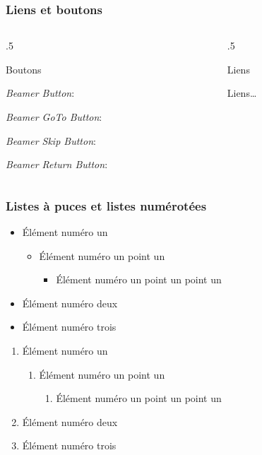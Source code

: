 \documentclass[aspectratio=1610,compress,t,english,french]{beamer}
\newenvironment{HECcomparaison}[1]{%
	\begin{column}[t]{.5\textwidth}
		\vspace{-7mm}		
		\begin{block}{#1}
}{%
		\end{block}
	\end{column}
}
\begin{document}
\begin{frame}
\frametitle{Liens et boutons}
	\begin{columns}
		\begin{HECcomparaison}{Boutons}
			\emph{Beamer Button}:\\			
			\hyperlink{paletteCouleurs}{}
			
			\emph{Beamer GoTo Button}:\\
			\hyperlink{structureDiapos}{}
			
			\emph{Beamer Skip Button}:\\
			\hyperlink{elementsInterface}{}
			
			\emph{Beamer Return Button}:\\
			\hyperlink{tdm}{}
		\end{HECcomparaison}
		\begin{HECcomparaison}{Liens}
			Liens\ldots
		\end{HECcomparaison}
	\end{columns}

\end{frame}

\begin{frame}
\frametitle{Listes à puces et listes numérotées}
	
	\begin{itemize}
		\item Élément numéro un
			\begin{itemize}
				\item Élément numéro un point un
					\begin{itemize}
						\item Élément numéro un point un point un
					\end{itemize}
			\end{itemize}
		\item Élément numéro deux
		\item Élément numéro trois
	\end{itemize}

	\begin{enumerate}
		\item Élément numéro un
		\begin{enumerate}
			\item Élément numéro un point un
			\begin{enumerate}
				\item Élément numéro un point un point un
			\end{enumerate}
		\end{enumerate}
		\item Élément numéro deux
		\item Élément numéro trois
	\end{enumerate}

\end{frame}
\end{document}
